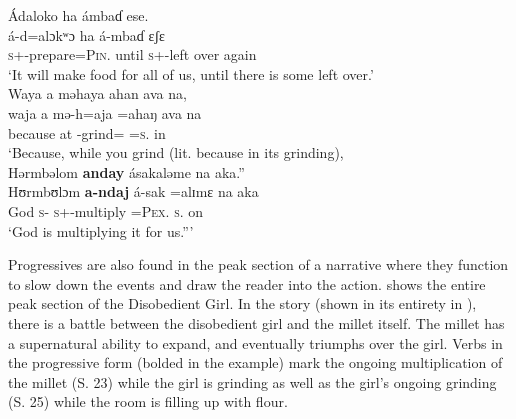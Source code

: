 \medskip
Ádaloko  ha  ámbaɗ  ese.\\ 
\gll  á-d=alɔkʷɔ  ha á-mbaɗ ɛʃɛ\\
      \textsc{s}+{\IFV}-prepare=\textsc{Pin}.{\IO}  until  {\textsc{s}+{\IFV}-left over}  again\\
\glt  ‘It will make food for all of us, until there is some left over.’\\

\medskip
 Waya  a  məhaya  ahan  ava  na,\\  
\gll  waja a mə-h=aja =ahaŋ ava na\\
      because  at   {\NOM}{}-grind={\PLU}   =\textsc{s}.{\POSS}   in   {\PSP}\\
\glt  ‘Because, while you grind (lit. because in its grinding),\\

\medskip
\largerpage
Hərmbəlom  \textbf{anday}   ásakaləme  na  aka.”\\
\gll  Hʊrmbʊlɔm \textbf{a-ndaj}  á-sak    =alɪmɛ na aka\\
      God            \textsc{s}-{\PROG}   \textsc{s}+{\IFV}-multiply =\textsc{Pex}.{\IO}   \textsc{s}.{\DO}   on\\
\glt  ‘God is multiplying it for us.”’
\z

Progressives are also found in the peak section of a narrative where they function to slow down the events and draw the reader into the action.  shows the entire peak section of the Disobedient Girl. In the story (shown in its entirety in ), there is a battle between the disobedient girl and the millet itself. The millet has a supernatural ability to expand, and eventually triumphs over the girl. Verbs in the progressive form (bolded in the example) mark the ongoing multiplication of the millet (S. 23) while the girl is grinding as well as the girl’s ongoing grinding (S. 25) while the room is filling up with flour. 



